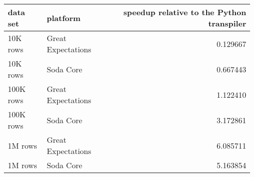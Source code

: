 \begin{tabular}{llr}
\toprule
data set & platform & speedup relative to the Python transpiler \\
\midrule
10K rows & Great Expectations & 0.129667 \\
10K rows & Soda Core & 0.667443 \\
100K rows & Great Expectations & 1.122410 \\
100K rows & Soda Core & 3.172861 \\
1M rows & Great Expectations & 6.085711 \\
1M rows & Soda Core & 5.163854 \\
\bottomrule
\end{tabular}
